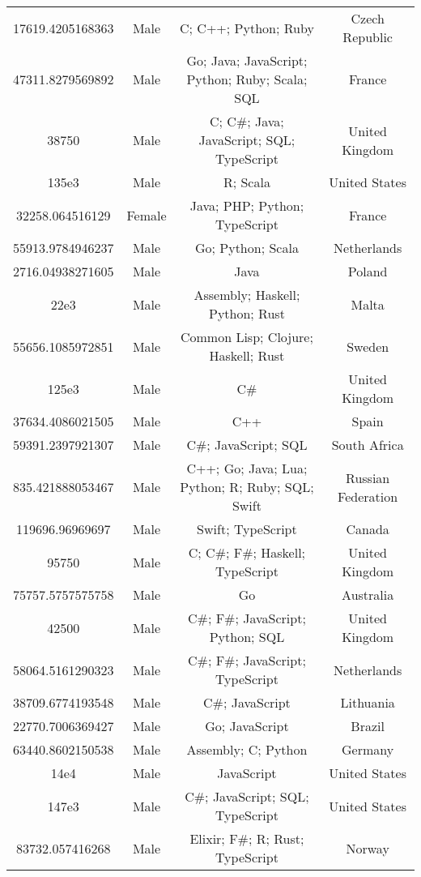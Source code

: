 \begin{center}
\begin{tabular}{ |c|c|c|c| }
17619.4205168363  &  Male  &  C; C++; Python; Ruby  &  Czech Republic  \\ 
47311.8279569892  &  Male  &  Go; Java; JavaScript; Python; Ruby; Scala; SQL  &  France  \\ 
38750  &  Male  &  C; C\#; Java; JavaScript; SQL; TypeScript  &  United Kingdom  \\ 
135e3  &  Male  &  R; Scala  &  United States  \\ 
32258.064516129  &  Female  &  Java; PHP; Python; TypeScript  &  France  \\ 
55913.9784946237  &  Male  &  Go; Python; Scala  &  Netherlands  \\ 
2716.04938271605  &  Male  &  Java  &  Poland  \\ 
22e3  &  Male  &  Assembly; Haskell; Python; Rust  &  Malta  \\ 
55656.1085972851  &  Male  &  Common Lisp; Clojure; Haskell; Rust  &  Sweden  \\ 
125e3  &  Male  &  C\#  &  United Kingdom  \\ 
37634.4086021505  &  Male  &  C++  &  Spain  \\ 
59391.2397921307  &  Male  &  C\#; JavaScript; SQL  &  South Africa  \\ 
835.421888053467  &  Male  &  C++; Go; Java; Lua; Python; R; Ruby; SQL; Swift  &  Russian Federation  \\ 
119696.96969697  &  Male  &  Swift; TypeScript  &  Canada  \\ 
95750  &  Male  &  C; C\#; F\#; Haskell; TypeScript  &  United Kingdom  \\ 
75757.5757575758  &  Male  &  Go  &  Australia  \\ 
42500  &  Male  &  C\#; F\#; JavaScript; Python; SQL  &  United Kingdom  \\ 
58064.5161290323  &  Male  &  C\#; F\#; JavaScript; TypeScript  &  Netherlands  \\ 
38709.6774193548  &  Male  &  C\#; JavaScript  &  Lithuania  \\ 
22770.7006369427  &  Male  &  Go; JavaScript  &  Brazil  \\ 
63440.8602150538  &  Male  &  Assembly; C; Python  &  Germany  \\ 
14e4  &  Male  &  JavaScript  &  United States  \\ 
147e3  &  Male  &  C\#; JavaScript; SQL; TypeScript  &  United States  \\ 
83732.057416268  &  Male  &  Elixir; F\#; R; Rust; TypeScript  &  Norway  \\ 

\end{tabular}
\end{center}
